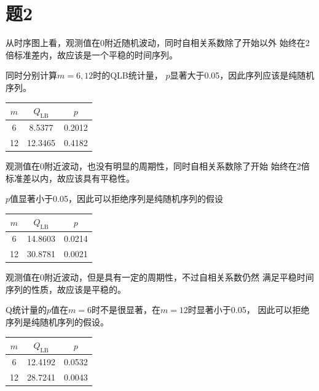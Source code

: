 \documentclass[cn]{homework}
\begin{document}
    \section{题2}
    \begin{subproblem}
        \item
        从时序图上看，观测值在0附近随机波动，同时自相关系数除了开始以外
        始终在2倍标准差内，故应该是一个平稳的时间序列。

        同时分别计算$m=6,12$时的QLB统计量，
        $p$显著大于0.05，因此序列应该是纯随机序列。
        \begin{margintable}
            \begin{tabular}{ccc}
                \toprule
                $m$ & $Q_{\mathrm{LB}}$ & $p$ \\
                \midrule
                6& 8.5377 & 0.2012\\
                12& 12.3465& 0.4182\\
                \bottomrule
            \end{tabular}
        \end{margintable}


        \item
        观测值在0附近波动，也没有明显的周期性，同时自相关系数除了开始
        始终在2倍标准差以内，故应该具有平稳性。

        $p$值显著小于0.05，因此可以拒绝序列是纯随机序列的假设
        \begin{margintable}
            \begin{tabular}{ccc}
                \toprule
                $m$ & $Q_{\mathrm{LB}}$ & $p$ \\
                \midrule
                6 & 14.8603 & 0.0214\\
                12 & 30.8781 & 0.0021\\
                \bottomrule
            \end{tabular}
        \end{margintable}


        \item
        观测值在0附近波动，但是具有一定的周期性，不过自相关系数仍然
        满足平稳时间序列的性质，故应该是平稳的。

        Q统计量的$p$值在$m=6$时不是很显著，在$m=12$时显著小于0.05，
        因此可以拒绝序列是纯随机序列的假设。
        \begin{margintable}
            \begin{tabular}{ccc}
                \toprule
                $m$ & $Q_{\mathrm{LB}}$ & $p$ \\
                \midrule
                6 & 12.4192 & 0.0532\\
                12 & 28.7241 & 0.0043\\
                \bottomrule
            \end{tabular}
        \end{margintable}


\end{subproblem}
\end{document}
